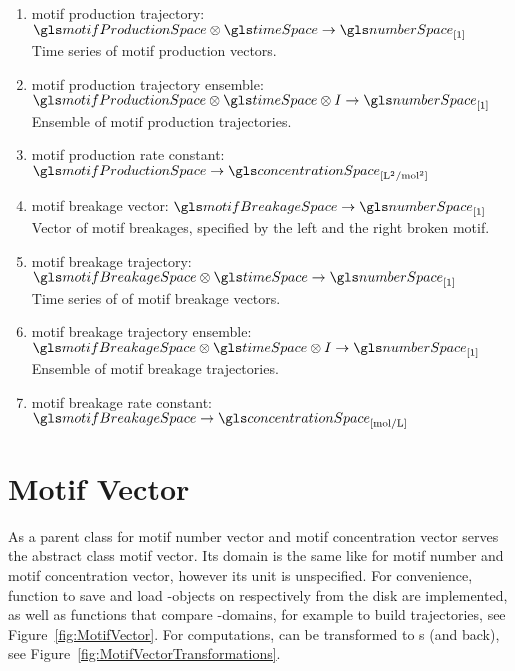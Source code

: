 \begin{enumerate}
    \item motif production trajectory: $\motifProductionSpace \otimes \timeSpace \rightarrow \numberSpace_{[1]}$\\
        Time series of motif production vectors.
    \item motif production trajectory ensemble: $\motifProductionSpace \otimes \timeSpace \otimes \Idx \rightarrow \numberSpace_{[1]}$\\
        Ensemble of motif production trajectories.
    \item motif production rate constant: $\motifProductionSpace \rightarrow \concentrationSpace_{[\mathrm{L}^2/\mathrm{mol}^2]}$
    \item motif breakage vector: $\motifBreakageSpace \rightarrow \numberSpace_{[1]}$\\
        Vector of motif breakages,
        specified by the left and the right broken motif.
    \item motif breakage trajectory: $\motifBreakageSpace \otimes \timeSpace \rightarrow \numberSpace_{[1]}$\\
        Time series of of motif breakage vectors.
    \item motif breakage trajectory ensemble: $\motifBreakageSpace \otimes \timeSpace \otimes \Idx \rightarrow \numberSpace_{[1]}$\\
        Ensemble of motif breakage trajectories.
    \item motif breakage rate constant: $\motifBreakageSpace \rightarrow \concentrationSpace_{[\mathrm{mol}/\mathrm{L}]}$\\
\end{enumerate}

\section{Motif Vector}
\label{sec:MotifVector}

As a parent class for motif number vector and motif concentration vector serves
the abstract class motif vector.
Its domain is the same like for motif number and motif concentration vector,
however its unit is unspecified.
For convenience, function to save and load -objects on
respectively from the disk are implemented, as well as functions that compare
-domains, for example to build trajectories, see
Figure~\ref{fig:MotifVector}.
For computations,  can be transformed to s
(and back), see Figure~\ref{fig:MotifVectorTransformations}.

